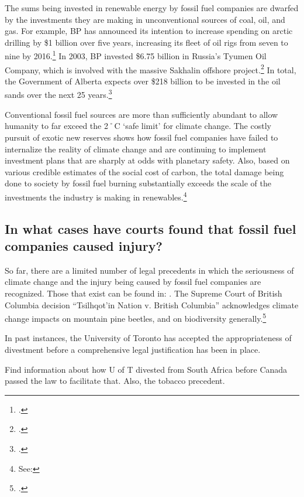 The sums being invested in renewable energy by fossil fuel companies are dwarfed by the investments they are making in unconventional sources of coal, oil, and gas.
For example, BP has announced its intention to increase spending on arctic drilling by \$1 billion over five years, increasing its fleet of oil rigs from seven to nine by 2016.\footcite[][]{BPArcticBillion}
In 2003, BP invested \$6.75 billion in Russia's Tyumen Oil Company, which is involved with the massive Sakhalin offshore project.\footcite[][]{NotBeyondInRussia}
In total, the Government of Alberta expects over \$218 billion to be invested in the oil sands over the next 25 years.\footcite[][]{OilSandsEconBenef}



Conventional fossil fuel sources are more than sufficiently abundant to allow humanity to far exceed the 2˚C `safe limit' for climate change.
The costly pursuit of exotic new reserves shows how fossil fuel companies have failed to internalize the reality of climate change and are continuing to implement investment plans that are sharply at odds with planetary safety.
Also, based on various credible estimates of the social cost of carbon, the total damage being done to society by fossil fuel burning substantially exceeds the scale of the investments the industry is making in renewables.\footnote{See: }

	
	
	\subsection{In what cases have courts found that fossil fuel companies caused injury?}
	\label{LegalPrecedents}
	
	
	
So far, there are a limited number of legal precedents in which the seriousness of climate change and the injury being caused by fossil fuel companies are recognized.
Those that exist can be found in: .
The Supreme Court of British Columbia decision ``Tsilhqot'in Nation v. British Columbia'' acknowledges climate change impacts on mountain pine beetles, and on biodiversity generally.\footcite[][p. 358, 406]{Tsilhqotin}


In past instances, the University of Toronto has accepted the appropriateness of divestment before a comprehensive legal justification has been in place.


\begin{vcom}
Find information about how U of T divested from South Africa before Canada passed the law to facilitate that. Also, the tobacco precedent.
\end{vcom}


